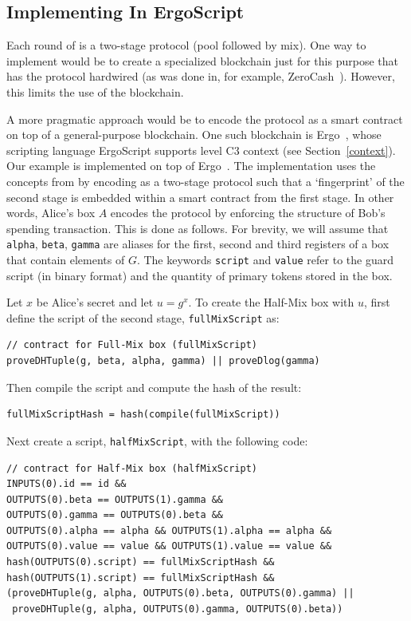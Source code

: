 \documentclass[11pt]{article}
\newcommand{\langname}{ErgoScript\xspace}
\begin{document}
\subsection{Implementing \algname In \langname}
\label{impl}
Each round of \algname is a two-stage protocol (pool followed by mix). One way to implement \algname would be to create a specialized blockchain just for this purpose that has the protocol hardwired (as was done in, for example, ZeroCash~\cite{zcash}). However, this limits the use of the blockchain. 

A more pragmatic approach would be to encode the protocol as a smart contract on top of a general-purpose blockchain. 
One such blockchain is Ergo~\cite{ergo}, whose scripting language \langname supports level C3 context (see Section~\ref{context}). Our example is implemented on top of Ergo~\cite{ergomix-impl}. 
The implementation uses the concepts from \cite{multistage} by encoding \algname as a two-stage protocol such that a `fingerprint' of the second stage is embedded within a smart contract from the first stage. 
In other words, Alice's box $A$ encodes the protocol by enforcing the structure of Bob's spending transaction. 
This is done as follows. For brevity, we will assume that \texttt{alpha}, \texttt{beta}, \texttt{gamma} are aliases for the first, second and third registers of a box that contain elements of $G$. The keywords \texttt{script} and \texttt{value} refer to the guard script (in binary format) and the quantity of primary tokens stored in the box. 

Let $x$ be Alice's secret and let $u = g^x$. To create the Half-Mix box with $u$, first define the script of the second stage, \texttt{fullMixScript} as:
\begin{Verbatim}[frame=single]
// contract for Full-Mix box (fullMixScript)
proveDHTuple(g, beta, alpha, gamma) || proveDlog(gamma)
\end{Verbatim}

Then compile the script and compute the hash of the result:

\begin{verbatim}
fullMixScriptHash = hash(compile(fullMixScript))
\end{verbatim}

Next create a script, \texttt{halfMixScript}, with the following code:
\begin{Verbatim}[frame=single]
// contract for Half-Mix box (halfMixScript)
INPUTS(0).id == id &&
OUTPUTS(0).beta == OUTPUTS(1).gamma && 
OUTPUTS(0).gamma == OUTPUTS(0).beta && 
OUTPUTS(0).alpha == alpha && OUTPUTS(1).alpha == alpha &&
OUTPUTS(0).value == value && OUTPUTS(1).value == value &&
hash(OUTPUTS(0).script) == fullMixScriptHash &&  
hash(OUTPUTS(1).script) == fullMixScriptHash &&
(proveDHTuple(g, alpha, OUTPUTS(0).beta, OUTPUTS(0).gamma) || 
 proveDHTuple(g, alpha, OUTPUTS(0).gamma, OUTPUTS(0).beta))
\end{Verbatim}
\end{document}
